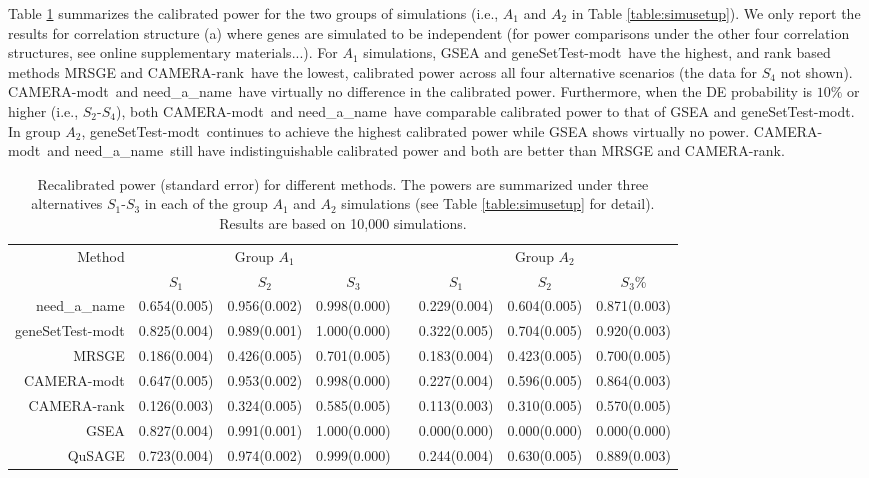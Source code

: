 \documentclass[useAMS,usenatbib, galley]{biom}
\newcommand{\OurMethod}{need\_a\_name}
\newcommand{\aaCase}{a}
\newcommand{\CMR}{CAMERA-rank}
\newcommand{\CMT}{CAMERA-modt}
\newcommand{\gent}{geneSetTest-modt}
\begin{document}
	Table \ref{table:power} summarizes the calibrated power for the two groups of simulations (i.e., $A_1$ and $A_2$ in Table \ref{table:simusetup}). We only report the results for correlation structure (\aaCase) where genes are simulated to be independent (for power comparisons under the other four correlation structures, see online supplementary materials...). %
	For $A_1$ simulations, GSEA and \gent~have the highest, and rank based methods MRSGE and \CMR~have the lowest, calibrated power across all four alternative scenarios (the data for $S_4$ not shown). \CMT~and \OurMethod~have virtually no difference in the calibrated power. Furthermore, when the DE probability is $10\%$ or higher (i.e., $S_2$-$S_4$), both \CMT~and \OurMethod~have comparable calibrated power to that of GSEA and \gent. In group $A_2$, \gent~continues to achieve the highest calibrated power while GSEA shows virtually no power. \CMT~and \OurMethod~still have indistinguishable calibrated power and both are better than MRSGE and \CMR.
	

	
	\begin{table*}
		\centering
		\caption{Recalibrated power (standard error) for different methods. The powers are summarized under three alternatives $S_1$-$S_3$ in each of the group $A_1$ and $A_2$ simulations (see Table \ref{table:simusetup} for detail). Results are based on 10,000 simulations. }\label{table:power}
		\begin{tabular}{rccc c ccc}
			\hline\hline
		Method	& \multicolumn{3}{c}{Group $A_1$} &  & \multicolumn{3}{c}{Group $A_2$} \\
			\cline{2-4}   \cline{6-8}
			 & $S_1$ & $S_2$ & $S_3$	 & & $S_1$ & $S_2$ & $S_3$\% \\
			 \cline{2-4}   \cline{6-8}
			\OurMethod & 0.654(0.005) & 0.956(0.002) & 0.998(0.000) & & 0.229(0.004) & 0.604(0.005) & 0.871(0.003)\\ 
			 \gent & 0.825(0.004) & 0.989(0.001) & 1.000(0.000) & &0.322(0.005) & 0.704(0.005) & 0.920(0.003) \\
			MRSGE & 0.186(0.004) & 0.426(0.005) & 0.701(0.005)& & 0.183(0.004) & 0.423(0.005) & 0.700(0.005) \\ 
			\CMT & 0.647(0.005) & 0.953(0.002) & 0.998(0.000)& & 0.227(0.004) & 0.596(0.005) & 0.864(0.003)  \\ 
			\CMR & 0.126(0.003) & 0.324(0.005) & 0.585(0.005) & &0.113(0.003) & 0.310(0.005) & 0.570(0.005) \\
			GSEA & 0.827(0.004) & 0.991(0.001) & 1.000(0.000) & & 0.000(0.000) & 0.000(0.000) & 0.000(0.000) \\ 
			QuSAGE & 0.723(0.004) & 0.974(0.002) & 0.999(0.000) & &  0.244(0.004) & 0.630(0.005) & 0.889(0.003) \\ 
			\hline\hline
		\end{tabular}
	\end{table*}
	
\end{document}
